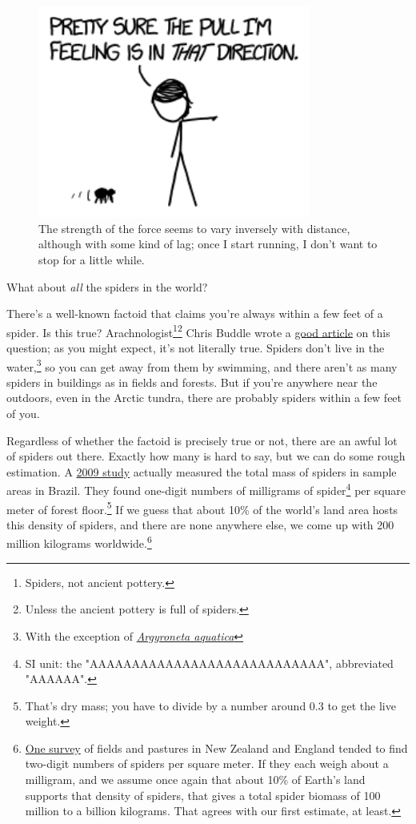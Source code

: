 {\begin{figure}[!htbp]
\centering
\includegraphics[scale=0.5, max width=0.8\textwidth]{imgs/a/136/force.png}
\caption{The strength of the force seems to vary inversely with distance, although with some kind of lag; once I start running, I don't want to stop for a little while.}
\end{figure}

{What about \emph{all} the spiders in the world?}

{There's a well-known factoid that claims you're always within a few feet of a spider. Is this true? Arachnologist{\footnote{Spiders, not ancient pottery.} } ​{\footnote{Unless the ancient pottery is full of spiders.} } Chris Buddle wrote a \href{http://arthropodecology.com/2012/06/05/you-are-always-within-three-feet-of-a-spider-fact-or-fiction/}{good article} on this question; as you might expect, it's not literally true. Spiders don't live in the water,{\footnote{With the exception of \emph{ \href{https://en.wikipedia.org/wiki/Diving\_bell\_spider} {Argyroneta aquatica}} } } so you can get away from them by swimming, and there aren't as many spiders in buildings as in fields and forests. But if you're anywhere near the outdoors, even in the Arctic tundra, there are probably spiders within a few feet of you.}

{Regardless of whether the factoid is precisely true or not, there are an awful lot of spiders out there. Exactly how many is hard to say, but we can do some rough estimation. A \href{http://www.bioone.org/doi/pdf/10.1636/T08-21.1}{2009 study} actually measured the total mass of spiders in sample areas in Brazil. They found one-digit numbers of milligrams of spider{\footnote{SI unit: the "AAAAAAAAAAAAAAAAAAAAAAAAAAAA", abbreviated "AAAAAA".} } per square meter of forest floor.{\footnote{That's dry mass; you have to divide by a number around 0.3 to get the live weight.} } If we guess that about 10\% of the world's land area hosts this density of spiders, and there are none anywhere else, we come up with 200 million kilograms worldwide.{\footnote{ \href{http://newzealandecology.org/nzje/2020}{One survey} of fields and pastures in New Zealand and England tended to find two-digit numbers of spiders per square meter. If they each weigh about a milligram, and we assume once again that about 10\% of Earth's land supports that density of spiders, that gives a total spider biomass of 100 million to a billion kilograms. That agrees with our first estimate, at least.} } }

}
